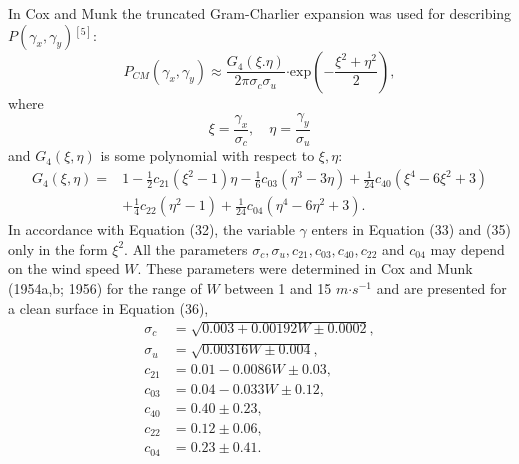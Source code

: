 \documentclass{mcmthesis}
\begin{document}
In Cox and Munk the truncated Gram-Charlier expansion was used for describing $P(\gamma_x, \gamma_y)$$^{[5]}$:
\begin{equation}
P_{CM}(\gamma_x, \gamma_y) \approx \frac{G_4(\xi. \eta)}{2\pi \sigma_c\sigma_u}\bm\cdot\mathrm{exp}\left( -\frac{\xi^2+\eta^2}{2} \right),
\end{equation}
where 
\begin{equation}
\xi = \frac{\gamma_x}{\sigma_c},\quad \eta = \frac{\gamma_y}{\sigma_u}
\end{equation}
and $G_4(\xi, \eta)$ is some polynomial with respect to $\xi, \eta$:
\begin{align}
G_4(\xi, \eta) =& 1-\frac{1}{2}c_{21}(\xi^2-1)\eta-\frac{1}{6}c_{03}(\eta^3-3\eta) \nonumber
 + \frac{1}{24}c_{40}(\xi^4-6\xi^2+3) \nonumber\\
& + \frac{1}{4}c_{22}(\eta^2-1) \nonumber + \frac{1}{24}c_{04}(\eta^4-6\eta^2+3). 
\end{align}
In accordance with Equation (32), the variable $\gamma$ enters in Equation (33) and (35) only in the form $\xi^2$. All the parameters $\sigma_c, \sigma_u, c_{21}, c_{03}, c_{40}, c_{22}$ and $ c_{04}$ may depend on the wind speed $W$. These parameters were determined in Cox and Munk (1954a,b; 1956) for the range of $W$ between 1 and 15 $m\bm\cdot s^{-1}$ and are presented for a clean surface in Equation (36),
\begin{align}
\sigma_c &=\sqrt{0.003 + 0.00192W \pm 0.0002}, \nonumber\\
\sigma_u &= \sqrt{0.00316W \pm 0.004},\nonumber\\
c_{21} &= 0.01 - 0.0086W\pm 0.03,\nonumber\\
c_{03} &= 0.04 - 0.033W \pm 0.12,\nonumber\\
c_{40} &= 0.40 \pm 0.23,\nonumber\\
c_{22}& = 0.12 \pm 0.06,\nonumber\\
c_{04} &= 0.23 \pm 0.41.
\end{align}
\end{document}
